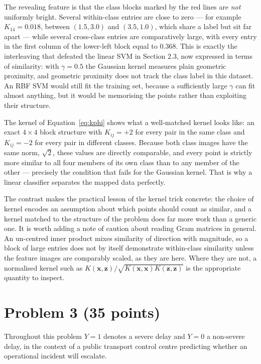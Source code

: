 \documentclass[11pt,a4paper]{article}
\begin{document}
The revealing feature is that the class blocks marked by the red lines are \emph{not}
uniformly bright. Several within-class entries are close to zero --- for example
$K_{14} = 0.018$, between $(1.5, 3.0)$ and $(3.5, 1.0)$, which share a label but sit far
apart --- while several cross-class entries are comparatively large, with every entry in the
first column of the lower-left block equal to $0.368$. This is exactly the interleaving that
defeated the linear SVM in Section 2.3, now expressed in terms of similarity: with
$\gamma = 0.5$ the Gaussian kernel measures plain geometric proximity, and geometric
proximity does not track the class label in this dataset. An RBF SVM would still fit the
training set, because a sufficiently large $\gamma$ can fit almost anything, but it would be
memorising the points rather than exploiting their structure.

The kernel of Equation~\eqref{eq:kphi} shows what a well-matched kernel looks like: an
exact $4 \times 4$ block structure with $K_{ij} = +2$ for every pair in the same class and
$K_{ij} = -2$ for every pair in different classes. Because both class images have the same
norm, $\sqrt{2}$, these values are directly comparable, and every point is strictly more similar
to all four members of its own class than to any member of the other --- precisely the
condition that fails for the Gaussian kernel. That is why a linear classifier separates the
mapped data perfectly.

The contrast makes the practical lesson of the kernel trick concrete: the choice of kernel
encodes an assumption about which points should count as similar, and a kernel matched to
the structure of the problem does far more work than a generic one. It is worth adding a
note of caution about reading Gram matrices in general. An un-centred inner product mixes
similarity of direction with magnitude, so a block of large entries does not by itself
demonstrate within-class similarity unless the feature images are comparably scaled, as
they are here. Where they are not, a normalised kernel such as
$K(\mathbf{x},\mathbf{z}) / \sqrt{K(\mathbf{x},\mathbf{x}) K(\mathbf{z},\mathbf{z})}$ is
the appropriate quantity to inspect.

\section{Problem 3 (35 points)}

Throughout this problem $Y = 1$ denotes a severe delay and $Y = 0$ a non-severe delay, in
the context of a public transport control centre predicting whether an operational incident
will escalate.
\end{document}

